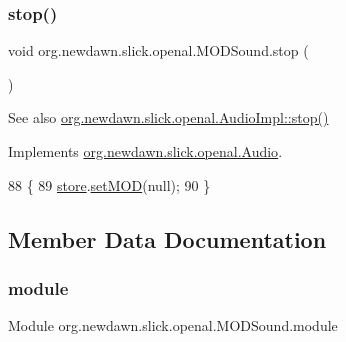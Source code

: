 \subsubsection{\texorpdfstring{stop()}{stop()}}
{\footnotesize\ttfamily void org.\+newdawn.\+slick.\+openal.\+M\+O\+D\+Sound.\+stop (\begin{DoxyParamCaption}{ }\end{DoxyParamCaption})\hspace{0.3cm}{\ttfamily [inline]}}

\begin{DoxySeeAlso}{See also}
\mbox{\hyperlink{classorg_1_1newdawn_1_1slick_1_1openal_1_1_audio_impl_a8ad896e19c35a9d3d1d93e52685158ff}{org.\+newdawn.\+slick.\+openal.\+Audio\+Impl\+::stop()}} 
\end{DoxySeeAlso}


Implements \mbox{\hyperlink{interfaceorg_1_1newdawn_1_1slick_1_1openal_1_1_audio_a8346ca83b84cb6605efb695462f12337}{org.\+newdawn.\+slick.\+openal.\+Audio}}.


\begin{DoxyCode}
88                        \{
89         \mbox{\hyperlink{classorg_1_1newdawn_1_1slick_1_1openal_1_1_m_o_d_sound_a36ab5f890c0566a6f9b1797fa91fdc7e}{store}}.\mbox{\hyperlink{classorg_1_1newdawn_1_1slick_1_1openal_1_1_sound_store_a2c4b2292d9999e9ab7afa5ac5ac27224}{setMOD}}(null);
90     \}
\end{DoxyCode}


\subsection{Member Data Documentation}
\mbox{\label{classorg_1_1newdawn_1_1slick_1_1openal_1_1_m_o_d_sound_a5ff6f055cad7b57fc73f7a13fe80fee4}} 
\subsubsection{\texorpdfstring{module}{module}}
{\footnotesize\ttfamily Module org.\+newdawn.\+slick.\+openal.\+M\+O\+D\+Sound.\+module\hspace{0.3cm}{\ttfamily [private]}}

